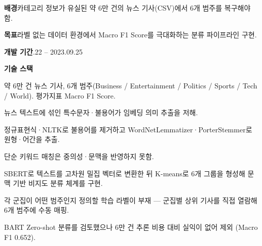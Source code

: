 

\begin{cvitems}
  \item {\textbf{배경}\enskip 카테고리 정보가 유실된 약 6만 건의 뉴스 기사(CSV)에서 6개 범주를 복구해야 함.}
  \item {\textbf{목표}\enskip 라벨 없는 데이터 환경에서 Macro F1 Score를 극대화하는 분류 파이프라인 구현.}
  \item {\textbf{개발 기간}.22 -- 2023.09.25}
  \item {\textbf{기술 스택}\enskip {}     }
\end{cvitems}

\begin{cvitems}
  \item {약 6만 건 뉴스 기사, 6개 범주(Business / Entertainment / Politics / Sports / Tech / World). 평가지표 Macro F1 Score.}
\end{cvitems}


\begin{substeps}
  \item 뉴스 텍스트에 섞인 특수문자·불용어가 임베딩 의미 추출을 저해.
  \item 정규표현식·NLTK로 불용어를 제거하고 WordNetLemmatizer·PorterStemmer로 원형·어간을 추출.
\end{substeps}

\begin{substeps}
  \item 단순 키워드 매칭은 중의성·문맥을 반영하지 못함.
  \item SBERT로 텍스트를 고차원 밀집 벡터로 변환한 뒤 K-means로 6개 그룹을 형성해 문맥 기반 비지도 분류 체계를 구현.
\end{substeps}

\begin{substeps}
  \item 각 군집이 어떤 범주인지 정의할 학습 라벨이 부재 --- 군집별 상위 기사를 직접 열람해 6개 범주에 수동 매핑.
  \item BART Zero-shot 분류를 검토했으나 6만 건 추론 비용 대비 실익이 없어 제외 (Macro F1 0.652).
\end{substeps}

